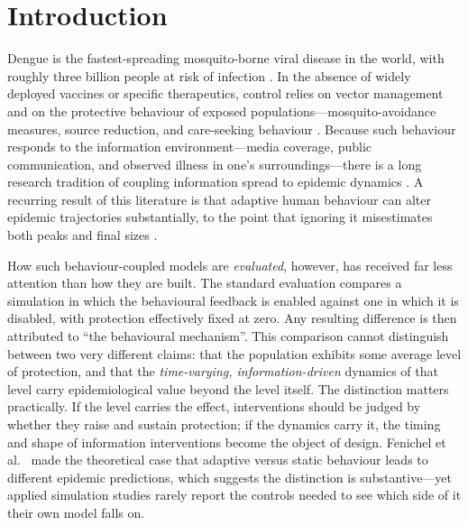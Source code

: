 \documentclass[]{interact}
\begin{document}
\section{Introduction}

Dengue is the fastest-spreading mosquito-borne viral disease in the world, with roughly three billion people at risk of infection \cite{kraemer2019past}. In the absence of widely deployed vaccines or specific therapeutics, control relies on vector management and on the protective behaviour of exposed populations---mosquito-avoidance measures, source reduction, and care-seeking behaviour \cite{esteva1998analysis}. Because such behaviour responds to the information environment---media coverage, public communication, and observed illness in one's surroundings---there is a long research tradition of coupling information spread to epidemic dynamics \cite{funk2009spread,funk2010modelling,perra2012activity}. A recurring result of this literature is that adaptive human behaviour can alter epidemic trajectories substantially, to the point that ignoring it misestimates both peaks and final sizes \cite{fenichel2011adaptive}.

How such behaviour-coupled models are \emph{evaluated}, however, has received far less attention than how they are built. The standard evaluation compares a simulation in which the behavioural feedback is enabled against one in which it is disabled, with protection effectively fixed at zero. Any resulting difference is then attributed to ``the behavioural mechanism''. This comparison cannot distinguish between two very different claims: that the population exhibits some average level of protection, and that the \emph{time-varying, information-driven} dynamics of that level carry epidemiological value beyond the level itself. The distinction matters practically. If the level carries the effect, interventions should be judged by whether they raise and sustain protection; if the dynamics carry it, the timing and shape of information interventions become the object of design. Fenichel et al.\ \cite{fenichel2011adaptive} made the theoretical case that adaptive versus static behaviour leads to different epidemic predictions, which suggests the distinction is substantive---yet applied simulation studies rarely report the controls needed to see which side of it their own model falls on.
\end{document}
